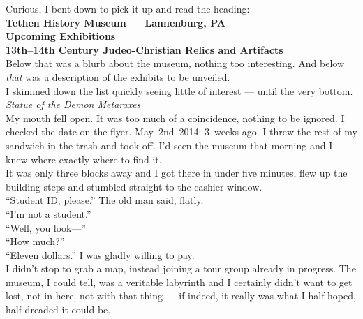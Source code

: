 \documentclass[a5paper]{scrartcl}
\begin{document}
Curious, I bent down to pick it up and read the heading:\\


\textbf{Tethen History Museum --- Lannenburg, PA}
\\


\textbf{Upcoming Exhibitions}
\\


\textbf{13th--14th Century Judeo-Christian Relics and Artifacts}
\\


Below that was a blurb about the museum, nothing too interesting. And below \textit{that}
 was a description of the exhibits to be unveiled.\\


I skimmed down the list quickly seeing little of interest --- until the very bottom.\\


\textit{Statue of the Demon Metaraxes}
\\


My mouth fell open. It was too much of a coincidence, nothing to be ignored. I checked the date on the flyer. May~2nd~2014: 3~weeks ago. I threw the rest of my sandwich in the trash and took off. I'd seen the museum that morning and I knew where exactly where to find it.\\


It was only three blocks away and I got there in under five minutes, flew up the building steps and stumbled straight to the cashier window.\\


\enquote{Student ID, please.} The old man said, flatly.\\


\enquote{I'm not a student.}\\


\enquote{Well, you look---}\\


\enquote{How much?}\\


\enquote{Eleven dollars.} I was gladly willing to pay.\\


I didn't stop to grab a map, instead joining a tour group already in progress. The museum, I could tell, was a veritable labyrinth and I certainly didn't want to get lost, not in here, not with that thing --- if indeed, it really was what I half hoped, half dreaded it could be.\\
\end{document}
